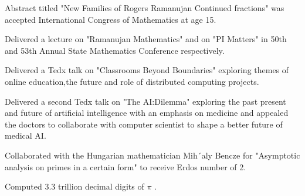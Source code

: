 \documentclass[]{deedy-resume-openfont}
\begin{document}
\begin{tightemize}\item Abstract titled "New Families of Rogers Ramanujan Continued fractions" was accepted International Congress of Mathematics at age 15.
\end{tightemize}
\sectionsep

\begin{tightemize}\item Delivered a lecture on "Ramanujan Mathematics" and on "PI Matters" in 50th and 53th Annual  State Mathematics Conference respectively.
\end{tightemize}
\sectionsep

\begin{tightemize}
\item Delivered a Tedx talk on "Classrooms Beyond Boundaries" exploring themes of online education,the future and role of distributed computing projects.

\item Delivered a second Tedx talk on "The AI:Dilemma" exploring the past present and future of artificial intelligence with an emphasis on medicine and appealed the doctors to collaborate with computer scientist to shape a better future of medical AI.


\end{tightemize}
\sectionsep

\begin{tightemize}
\item Collaborated with the Hungarian mathematician Mih´aly Bencze for "Asymptotic analysis on primes in a certain form" to receive Erdos number of 2.

\end{tightemize}
\sectionsep

\begin{tightemize}
\item Computed $3.3$ trillion decimal digits of $\pi$ .
\end{tightemize}
\sectionsep
\end{document}
